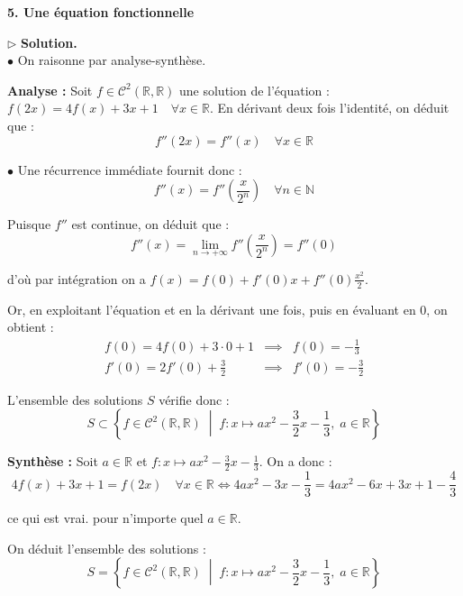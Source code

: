 \documentclass[11pt,a4paper]{article}
\begin{document}
\begin{center}
    \large \textbf{5. Une équation fonctionnelle}
\end{center}
\vspace{0.2cm}

\noindent{}
\vspace{0.4cm}

\noindent $\triangleright$ \textbf{Solution.} \\
\noindent $\bullet$ On raisonne par analyse-synthèse.

\noindent \textbf{Analyse :} Soit $f \in \mathcal{C}^2(\mathbb{R}, \mathbb{R})$ une solution de l'équation : $f(2x) = 4f(x) + 3x + 1 \quad \forall x \in \mathbb{R}$. En dérivant deux fois l'identité, on déduit que :
$$ f''(2x) = f''(x) \quad \forall x \in \mathbb{R} $$   

\noindent $\bullet$ Une récurrence immédiate fournit donc :
$$ f''(x) = f''\left(\frac{x}{2^n}\right) \quad \forall n \in \mathbb{N} $$

\noindent Puisque $f''$ est continue, on déduit que :
$$ f''(x) = \lim_{n \to +\infty} f''\left(\frac{x}{2^n}\right) = f''(0) $$

\noindent d'où par intégration on a $f(x) = f(0) + f'(0)x + f''(0)\frac{x^2}{2}$.

\noindent Or, en exploitant l'équation et en la dérivant une fois, puis en évaluant en $0$, on obtient :
$$ \begin{array}{lcl} f(0) = 4f(0) + 3 \cdot 0 + 1 & \implies & f(0) = -\frac{1}{3} \\ f'(0) = 2f'(0) + \frac{3}{2} & \implies & f'(0) = -\frac{3}{2} \end{array} $$

\noindent L'ensemble des solutions $S$ vérifie donc :
$$ S \subset \left\{ f \in \mathcal{C}^2(\mathbb{R}, \mathbb{R}) \;\middle|\; f : x \mapsto ax^2 - \frac{3}{2}x - \frac{1}{3}, \; a \in \mathbb{R} \right\} $$

\noindent \textbf{Synthèse :} Soit $a \in \mathbb{R}$ et $f : x \mapsto ax^2 - \frac{3}{2}x - \frac{1}{3}$. On a donc :
$$ 4f(x) + 3x + 1 = f(2x) \quad \forall x \in \mathbb{R} \iff 4ax^2 - 3x - \frac{1}{3} = 4ax^2 - 6x + 3x + 1 - \frac{4}{3} $$

\noindent ce qui est vrai. pour n'importe quel $a \in \mathbb{R}$.

\noindent On déduit l'ensemble des solutions :
$$ \boxed{S = \left\{ f \in \mathcal{C}^2(\mathbb{R}, \mathbb{R}) \;\middle|\; f : x \mapsto ax^2 - \frac{3}{2}x - \frac{1}{3}, \; a \in \mathbb{R} \right\}} $$ 
\end{document}
